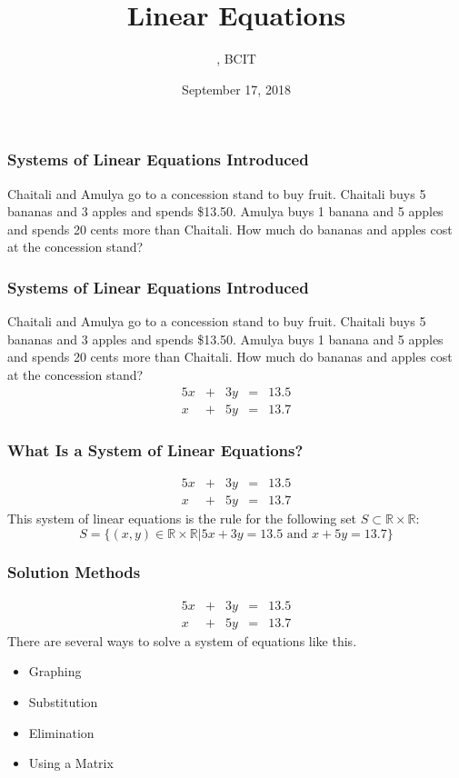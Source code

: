 \documentclass[xcolor=dvipsnames]{beamer}
\title{Linear Equations}
\subtitle{{\CourseNumber}, BCIT}
\author{\CourseName}
\date{September 17, 2018}
\begin{document}
\begin{frame}
  \titlepage
\end{frame}

\begin{frame}
  \frametitle{Systems of Linear Equations Introduced}
  Chaitali and Amulya go to a concession stand to buy fruit. Chaitali
  buys 5 bananas and 3 apples and spends \$13.50. Amulya buys 1 banana
  and 5 apples and spends 20 cents more than Chaitali. How much do
  bananas and apples cost at the concession stand?
\end{frame}

\begin{frame}
  \frametitle{Systems of Linear Equations Introduced}
  Chaitali and Amulya go to a concession stand to buy fruit. Chaitali
  buys 5 bananas and 3 apples and spends \$13.50. Amulya buys 1 banana
  and 5 apples and spends 20 cents more than Chaitali. How much do
  bananas and apples cost at the concession stand?
  \begin{equation}
    \label{eq:mohloogh}
    \begin{array}{rcrcl}
      5x&+&3y&=&13.5 \\
      x&+&5y&=&13.7
    \end{array}
  \end{equation}
\end{frame}

\begin{frame}
  \frametitle{What Is a System of Linear Equations?}
  \begin{equation}
    \label{eq:xaigeeke}
    \begin{array}{rcrcl}
      5x&+&3y&=&13.5 \\
      x&+&5y&=&13.7
    \end{array}
  \end{equation}
  This system of linear equations is the rule for the following set $S\subset\mathbb{R}\times\mathbb{R}$:
  \begin{equation}
    \label{eq:ahshohwa}
S=\{\left.(x,y)\in\mathbb{R}\times\mathbb{R}\right\vert5x+3y=13.5\mbox{ and }x+5y=13.7\}
  \end{equation}
\end{frame}

\begin{frame}
  \frametitle{Solution Methods}
  \begin{equation}
    \label{eq:yeghahpi}
    \begin{array}{rcrcl}
      5x&+&3y&=&13.5 \\
      x&+&5y&=&13.7
    \end{array}
  \end{equation}
There are several ways to solve a system of equations like this. 
\begin{itemize}
\item Graphing
\item Substitution
\item Elimination
\item Using a Matrix
\end{itemize}
\end{frame}
\end{document}
